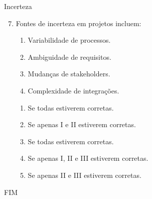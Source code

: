 \documentclass{beamer}
\begin{document}
\begin{frame}{Incerteza}
	\begin{enumerate}
		\setcounter{enumi}{6}
		\justifying
		\item Fontes de incerteza em projetos incluem:
		\begin{enumerate}[I]
			\item Variabilidade de processos.
			\item Ambiguidade de requisitos.
			\item Mudanças de stakeholders.
			\item Complexidade de integrações.
		\end{enumerate}
		\begin{enumerate}[a]
			\item Se todas estiverem corretas.
			\item Se apenas I e II estiverem corretas.
			\item \alert<2>{Se todas estiverem corretas.}
			\item Se apenas I, II e III estiverem corretas.
			\item Se apenas II e III estiverem corretas.
		\end{enumerate}
	\end{enumerate}
\end{frame}


\begin{frame}
	\centering
	\Large
	FIM
\end{frame}
\end{document}
